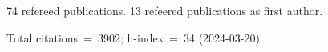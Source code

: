 74 refereed publications. 13 refeered publications as first author.

Total citations~=~3902; h-index~=~34 (2024-03-20)